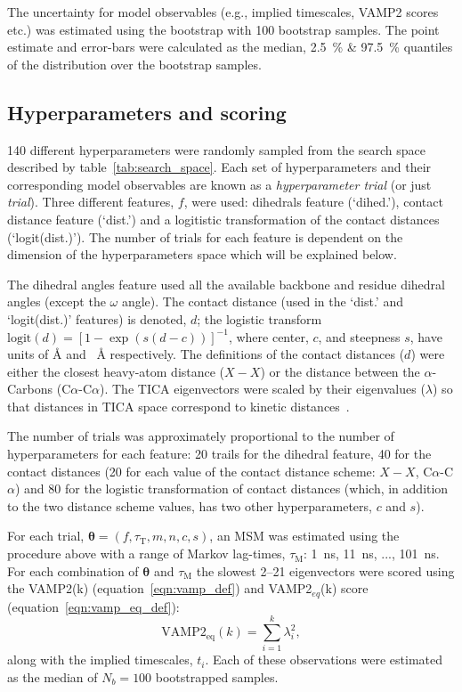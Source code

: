 \documentclass[journal=jacsat,manuscript=article]{achemso}
\begin{document}
The uncertainty for model observables (e.g., implied timescales, VAMP2 scores etc.) was estimated using the bootstrap with \num{100} bootstrap samples. The point estimate and error-bars  were calculated as the median,   \SI{2.5}{\percent} \& \SI{97.5}{\percent} quantiles of the distribution over the bootstrap samples.

\subsection{Hyperparameters and scoring}
\num{140} different hyperparameters were randomly sampled from the search space described by table~\ref{tab:search_space}. Each set of hyperparameters and their corresponding model observables are known as a \emph{hyperparameter trial} (or just \emph{trial}). Three different features, $f$, were used: dihedrals feature (`dihed.'), contact distance feature (`dist.') and a logitistic transformation of the contact distances (`logit(dist.)').  The number of trials for each feature is dependent on the dimension of the hyperparameters space which will be explained below. 

The dihedral angles feature used all the available backbone and residue dihedral angles (except the $\omega$ angle). The contact distance (used in the `dist.' and `logit(dist.)' features) is denoted, $d$; the logistic transform $\mathrm{logit}(d) = [1-\exp{(s(d-c))}]^{-1}$, where center, $c$, and steepness $s$,  have units of \si{\angstrom} and \si{\per\angstrom} respectively. The definitions of the contact distances ($d$) were either the closest heavy-atom distance ($X-X$) or the distance between the $\alpha$-Carbons (C$\alpha$-C$\alpha$). The TICA eigenvectors were scaled by their eigenvalues ($\lambda$) so that distances in TICA space correspond to kinetic distances~\cite{noeKineticDistanceKinetic2015}.

The number of trials was approximately proportional to the number of hyperparameters for each feature: 20 trails for the dihedral feature, 40 for the contact distances (20 for each value of the contact distance scheme: $X-X$,  C$\alpha$-C$\alpha$) and 80 for the logistic transformation of contact distances (which, in addition to the two distance scheme values, has two other hyperparameters, $c$ and $s$). 

For each trial,  $\bm{\theta} = (f, \tau_{\mathrm{T}}, m, n, c, s)$,  an MSM was estimated using the procedure above with a range of Markov lag-times, $\tau_{\mathrm{M}}$: \SI{1}{\nano\second}, \SI{11}{\nano\second}, ..., \SI{101}{\nano\second}. For each combination of $\bm{\theta}$ and  $\tau_{\mathrm{M}}$ the slowest \numrange{2}{21} eigenvectors were scored using the VAMP2(k) (equation~\ref{eqn:vamp_def}) and  VAMP2$_{eq}$(k) score (equation~\ref{eqn:vamp_eq_def}):
\begin{equation}
    \operatorname{VAMP2_{eq}}(k) = \sum_{i=1}^{k}\lambda_{i}^{2}, \label{eqn:vamp_eq_def}
\end{equation}
along with the implied timescales, $t_i$.  Each of these observations were estimated as the median of $N_b=100$ bootstrapped samples. 
\end{document}
